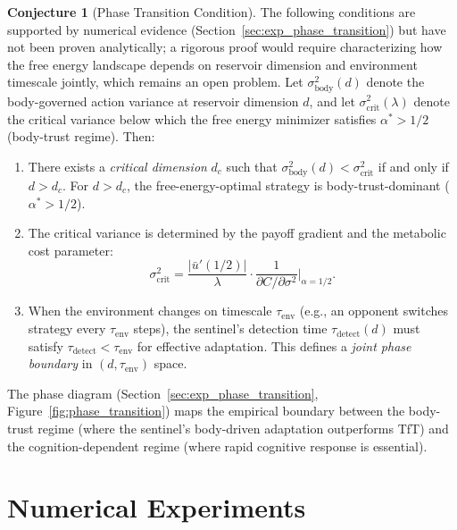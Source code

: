 \documentclass[11pt,a4paper]{article}
\theoremstyle{definition}
\newtheorem{conjecture}[theorem]{Conjecture}
\begin{document}
\begin{conjecture}[Phase Transition Condition]
\label{conj:phase_transition}
The following conditions are supported by numerical evidence
(Section~\ref{sec:exp_phase_transition}) but have not been proven
analytically; a rigorous proof would require characterizing how the
free energy landscape depends on reservoir dimension and environment
timescale jointly, which remains an open problem.
Let $\sigma^2_{\mathrm{body}}(d)$ denote the body-governed action variance
at reservoir dimension $d$, and let $\sigma^2_{\mathrm{crit}}(\lambda)$
denote the critical variance below which the free energy minimizer satisfies
$\alpha^{*} > 1/2$ (body-trust regime).  Then:
\begin{enumerate}[label=(\alph*)]
  \item There exists a \emph{critical dimension} $d_c$ such that
    $\sigma^2_{\mathrm{body}}(d) < \sigma^2_{\mathrm{crit}}$ if and only if
    $d > d_c$.  For $d > d_c$, the free-energy-optimal strategy is
    body-trust-dominant ($\alpha^{*} > 1/2$).
  \item The critical variance is determined by the payoff gradient and the
    metabolic cost parameter:
    \[
      \sigma^2_{\mathrm{crit}} = \frac{|\bar{u}'(1/2)|}{\lambda}
        \cdot \frac{1}{\partial C / \partial \sigma^2}\bigg|_{\alpha=1/2}.
    \]
  \item When the environment changes on timescale $\tau_{\mathrm{env}}$
    (e.g., an opponent switches strategy every $\tau_{\mathrm{env}}$ steps),
    the sentinel's detection time $\tau_{\mathrm{detect}}(d)$ must satisfy
    $\tau_{\mathrm{detect}} < \tau_{\mathrm{env}}$ for effective adaptation.
    This defines a \emph{joint phase boundary} in $(d, \tau_{\mathrm{env}})$ space.
\end{enumerate}
\end{conjecture}

The phase diagram (Section~\ref{sec:exp_phase_transition},
Figure~\ref{fig:phase_transition}) maps the empirical boundary between
the body-trust regime (where the sentinel's body-driven adaptation outperforms
TfT) and the cognition-dependent regime (where rapid cognitive response is
essential).


\section{Numerical Experiments}
\label{sec:experiments}
\end{document}
